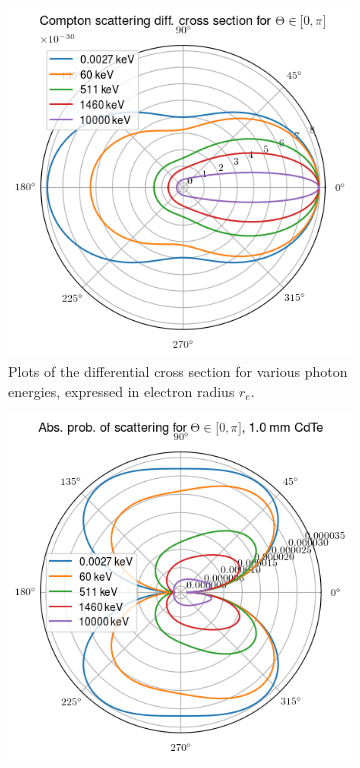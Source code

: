 \documentclass[a4paper,12pt,titlepage, twoside]{article}
\begin{document}
\begin{figure}
  \centering
  \begin{subfigure}{0.48\textwidth}
    \includegraphics[width=1.0\textwidth]{./fig/klein_nishina_1.png}
    \caption{Plots of the differential cross section for various photon energies, expressed in electron radius $r_e$.}
    \label{fig:klein_1}
  \end{subfigure}
  \begin{subfigure}{0.48\textwidth}
    \includegraphics[width=1.0\textwidth]{./fig/klein_nishina_2.png}

\end{subfigure}
\end{figure}
\end{document}
